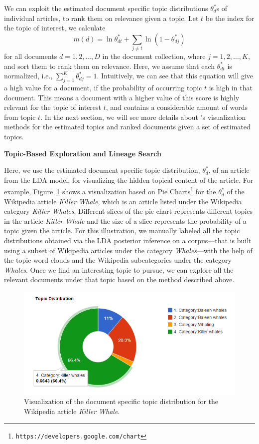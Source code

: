 We can exploit the estimated document specific topic 
distributions $\theta_d^{*}$s of individual articles, to rank them 
on relevance given a topic. Let $t$ be the index for the topic of 
interest, we calculate~\cite{George2012}
\begin{equation}
m(d) = \ln \theta^*_{dt} + \sum_{j \neq t}{\ln (1 - \theta^*_{dj})}
\end{equation}
for all documents $d = 1, 2, \ldots, D$ in the document collection, 
where $j = 1, 2, \ldots, K$, and sort them to rank them on relevance. 
Here, we assume that each $\theta^*_{dt}$ is normalized, i.e., 
$\sum_{j=1}^{K}{\theta^*_{dj}} = 1$. Intuitively, we can see that 
this equation will give a high value for a document, if the probability 
of occurring topic $t$ is high in that document. This means a 
document with a higher value of this score is highly relevant for 
the topic of interest $t$, and contains a considerable amount of 
words from topic $t$. In the next section, we will see more details 
about \system's visualization methods for the estimated topics and 
ranked documents given a set of estimated topics.      


\noindent\textbf{Topic-Based Exploration and Lineage Search}

Here, we use the estimated document specific topic distribution, 
$\theta^*_{d}$, of an article from the LDA model, for visualizing 
the hidden topical content of the article. For example, Figure~\ref{fig:doc-topic-distribution} shows a visualization based on Pie
Charts\footnote{\texttt{https://developers.google.com/chart}} for 
the $\theta^*_{d}$ of the Wikipedia article \textit{Killer Whale}, 
which is an article listed under the Wikipedia category          
\textit{Killer Whales}. Different slices of the pie chart represents
different topics in the article \textit{Killer Whale} and the size 
of a slice represents the probability of a topic given the article. 
For this illustration, we manually labeled all the topic 
distributions obtained via the LDA posterior inference on a 
corpus---that is built using a subset of Wikipedia articles under the 
category \textit{Whales}---with the help of the topic word clouds 
and the Wikipedia subcategories under the category \textit{Whales}.         
Once we find an interesting topic to pursue, we can explore all 
the relevant documents under that topic based on the method 
described above. 

\begin{figure}[htb]\centering 
\includegraphics[width=.45\textwidth]{images/doc_topic_distribution.png}
\caption{Visualization of the document specific topic distribution 
for the Wikipedia article \textit{Killer Whale}.}
\label{fig:doc-topic-distribution}
\end{figure}

